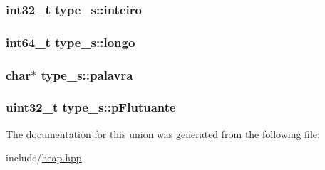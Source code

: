 \hypertarget{uniontype__s_aae62bd50056419f589251ba19ccec495}{
\subsubsection[{inteiro}]{\setlength{\rightskip}{0pt plus 5cm}int32\+\_\+t type\+\_\+s\+::inteiro}}\label{uniontype__s_aae62bd50056419f589251ba19ccec495}
\hypertarget{uniontype__s_ac1a3506b187aafcb7e0d2d40fe3504eb}{
\subsubsection[{longo}]{\setlength{\rightskip}{0pt plus 5cm}int64\+\_\+t type\+\_\+s\+::longo}}\label{uniontype__s_ac1a3506b187aafcb7e0d2d40fe3504eb}
\hypertarget{uniontype__s_a928b195b66117b6e096e827bae77e383}{
\subsubsection[{palavra}]{\setlength{\rightskip}{0pt plus 5cm}char$\ast$ type\+\_\+s\+::palavra}}\label{uniontype__s_a928b195b66117b6e096e827bae77e383}
\hypertarget{uniontype__s_a623284016957f5697ce4e7d8c68330d9}{
\subsubsection[{p\+Flutuante}]{\setlength{\rightskip}{0pt plus 5cm}uint32\+\_\+t type\+\_\+s\+::p\+Flutuante}}\label{uniontype__s_a623284016957f5697ce4e7d8c68330d9}


The documentation for this union was generated from the following file\+:\begin{DoxyCompactItemize}
\item 
include/\hyperlink{heap_8hpp}{heap.\+hpp}\end{DoxyCompactItemize}
